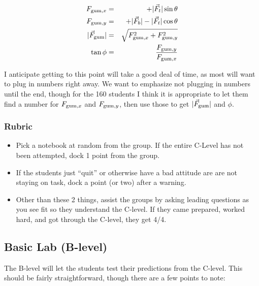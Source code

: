 \documentclass[fleqn,letterpaper]{article}
\begin{document}
\begin{eqnarray*}
 F_{{\rm gum},x} & = & + |\vec{F}_t| \sin \theta \\
 F_{{\rm gum},y} & = & +|\vec{F}_b| - |\vec{F}_t| \cos \theta \\
 |\vec{F}_{\rm gum}| & = & \sqrt{F_{{\rm gum},x}^2 + F_{{\rm gum},y}^2} \\
 \tan \phi & = & \frac{F_{{\rm gum},y}}{F_{{\rm gum},x}}
\end{eqnarray*}

I anticipate getting to this point will take a good deal of time, as most will want to plug in numbers right away.  We want to emphasize not plugging in numbers until the end, though for the 160 students I think it is appropriate to let them find a number for $ F_{{\rm gum},x}$ and $ F_{{\rm gum},y}$, then use those to get $|\vec{F}_{\rm gum}|$ and $\phi$.

\subsubsection*{Rubric}

\begin{itemize}
 \item{Pick a notebook at random from the group.  If the entire C-Level has not been attempted, dock 1 point from the group.}
 \item{If the students just ``quit'' or otherwise have a bad attitude are are not staying on task, dock a point (or two) after a warning.}
 \item{Other than these 2 things, assist the groups by asking leading questions as you see fit so they understand the C-level.  If they came prepared, worked hard, and got through the C-level, they get 4/4.}
\end{itemize}


\subsection*{Basic Lab (B-level)}

The B-level will let the students test their predictions from the C-level.  This should be fairly straightforward, though there are a few points to note:
\end{document}

